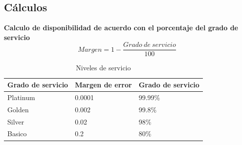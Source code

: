 \documentclass[12pt,letterpaper]{article}
\begin{document}
\newpage
\subsection{Cálculos}
\textbf{Calculo de disponibilidad de acuerdo con el porcentaje del grado de servicio}
\begin{equation}
    Margen=1-\frac{Grado \ de \ servicio}{100}
\end{equation}

\begin{table}[ht]
    \centering
    \begin{tabular}{|l|l|l|}
    \hline
    Grado de servicio & Margen de error & Grado de servicio \\ \hline
    Platinum & 0.0001 & 99.99\% \\ \hline
    Golden & 0.002 & 99.8\% \\ \hline
    Silver & 0.02 & 98\% \\ \hline
    Basico & 0.2 & 80\% \\ \hline
    \end{tabular}
    \caption{Niveles de servicio}
    \label{my-label}
\end{table}
\end{document}
